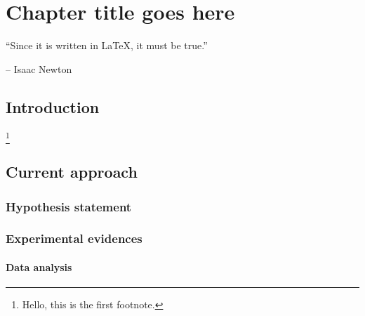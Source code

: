 \chapter{Chapter title goes here} \label{chap:chap-3}



\epigraph{\enquote{Since it is written in \LaTeX, it must be true.}}{-- Isaac Newton}




\section{Introduction}
\blindtext \footnote{ Hello, this is the first footnote.}


\section{Current approach}
\blindtext 

\subsection{Hypothesis statement}
\blindtext


\subsection{Experimental evidences}
\blindtext


\subsubsection{Data analysis}
\blindtext